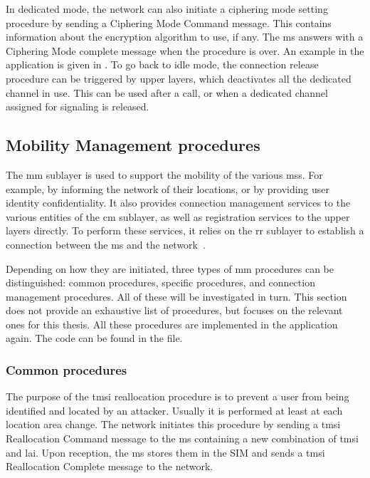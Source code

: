     In dedicated mode, the network can also initiate a ciphering mode
    setting procedure by sending a Ciphering Mode Command message. This
    contains information about the encryption algorithm to use, if any.
    The \gls{ms} answers with a Ciphering Mode complete message when the
    procedure is over. An example in the  application is
    given in . To go back to idle mode, the
    connection release procedure can be triggered by upper layers, which
    deactivates all the dedicated channel in use. This can be used after
    a call, or when a dedicated channel assigned for signaling is
    released.

  \subsection{Mobility Management procedures}

    The \gls{mm} sublayer is used to support the mobility of the various
    \glspl{ms}. For example, by informing the network of their
    locations, or by providing user identity confidentiality. It also
    provides connection management services to the various entities of
    the \gls{cm} sublayer, as well as registration services to the upper
    layers directly. To perform these services, it relies on the
    \gls{rr} sublayer to establish a connection between the \gls{ms} and
    the network~\cite{3gpp_ts_2015-5}. 

    Depending on how they are initiated, three types of \gls{mm}
    procedures can be distinguished: common procedures, specific
    procedures, and connection management procedures. All of these will
    be investigated in turn. This section does not provide an exhaustive
    list of procedures, but focuses on the relevant ones for this
    thesis. All these procedures are implemented in the 
    application again. The code can be found in the
     file.

    \subsubsection{Common procedures}
    \label{sec:mm_proc_com}

    The purpose of the \gls{tmsi} reallocation procedure is to prevent a
    user from being identified and located by an attacker. Usually it is
    performed at least at each location area change. The network
    initiates this procedure by sending a \gls{tmsi} Reallocation
    Command message to the \gls{ms} containing a new combination of
    \gls{tmsi} and \gls{lai}.  Upon reception, the \gls{ms} stores them
    in the SIM and sends a \gls{tmsi} Reallocation Complete message to
    the network.

